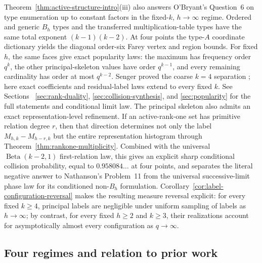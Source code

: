 \documentclass[11pt,reqno]{amsart}
\theoremstyle{definition}
\theoremstyle{remark}
\begin{document}
 Theorem~\ref{thm:active-structure-intro}\textup{(iii)} also answers
 O'Bryant's Question~6 on type enumeration up to constant factors in the
 fixed-$k$, $h\to\infty$ regime.  Ordered
and generic $B_h$ types and the transferred
multiplication-table types have the same total exponent
$(k-1)(k-2)$.  At four points the type-$A$ coordinate dictionary yields the
diagonal order-six Farey vertex and region bounds.  For fixed $h$, the same
faces give exact popularity laws: the maximum has frequency order $q^k$,
the other principal-skeleton values have order $q^{k-1}$, and every
remaining cardinality has order at most $q^{k-2}$.  Senger proved the coarse
$k=4$ separation \cite[Theorem~2]{Senger2025}; here exact coefficients and
residual-label laws extend to every fixed $k$.  See Sections~
\ref{sec:rank-duality}, \ref{sec:collision-synthesis}, and
\ref{sec:popularity} for the full statements and conditional limit law.
The principal skeleton also admits an exact representation-level refinement.
If an active-rank-one set has primitive relation degree $r$, then that
direction determines not only the label $M_{h,k}-M_{h-r,k}$ but the entire
representation histogram through Theorem~\ref{thm:rankone-multiplicity}.
Combined with the universal $\operatorname{Beta}(k-2,1)$ first-relation law,
this gives an explicit sharp conditional collision probability, equal to
$0.958084\ldots$ at four points, and separates the literal negative answer
to Nathanson's Problem~11 \cite[Problem~11]{NathansonTriangular} from the
universal successive-limit phase law for its conditioned non-$B_h$
formulation.
Corollary~\ref{cor:label-configuration-reversal} makes the resulting measure
reversal explicit: for every fixed $k\geq4$, principal labels are negligible
under uniform sampling of labels as $h\to\infty$; by contrast, for every fixed
$h\geq2$ and $k\geq3$, their realizations account for asymptotically almost
every configuration as $q\to\infty$.

\subsection*{Four regimes and relation to prior work}
\end{document}
